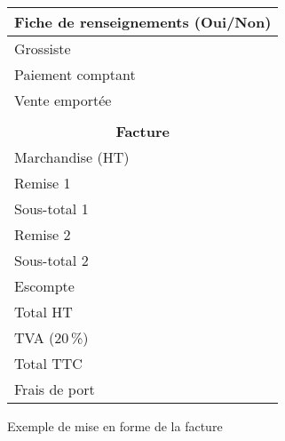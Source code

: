 \documentclass[a4paper, 9pt]{article}
\begin{document}
  \begin{center} %
    \begin{tabularx}{0.5\linewidth}{|l|X|}
      \hline
      \multicolumn{2}{|c|}{\bfseries Fiche de renseignements (Oui/Non)} \\
      \hline\hline
      Grossiste         & \\
      \hline
      Paiement comptant & \\
      \hline
      Vente emport\'ee    & \\
      \hline
      \multicolumn{2}{c}{} \\
      \hline
      \multicolumn{2}{|c|}{\bfseries Facture} \\
      \hline\hline
      Marchandise (HT)  & \\
      \hline\hline
      Remise 1          & \\
      \hline
      Sous-total 1      & \\
      \hline
      Remise 2          & \\
      \hline
      Sous-total 2      & \\
      \hline\hline
      Escompte          & \\
      \hline
      Total HT          & \\
      \hline\hline
      TVA ($20$\,\%)    & \\
      \hline
      Total TTC         & \\
      \hline\hline
      Frais de port     & \\
      \hline
    \end{tabularx}
    \medskip
    
    Exemple de mise en forme de la facture
  \end{center}

  
  
\end{document}
